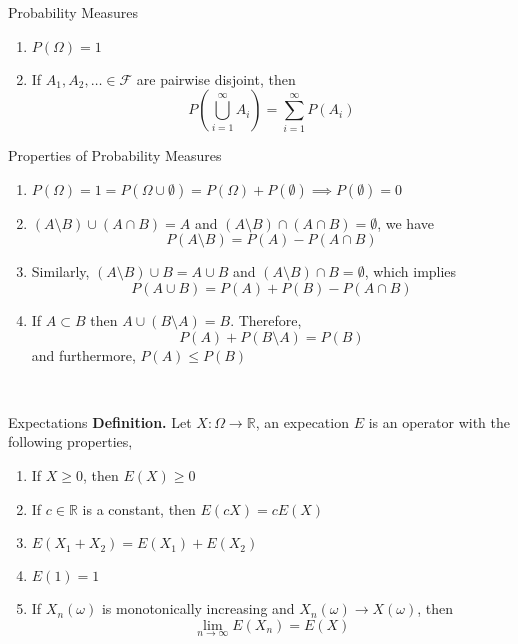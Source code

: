 \documentclass{article}
\begin{document}
\begin{multicols*}{3}
\begin{blackbox}{Probability Measures}
\begin{enumerate}[label=(\roman*)]
        \item $P(\Omega) = 1$
        \item If $A_1, A_2, \ldots \in \mathcal{F}$ are pairwise disjoint, then\\[-2ex]
        \[P\left(\bigcup_{i=1}^\infty A_i\right) = \sum_{i=1}^\infty P(A_i)\]
    \end{enumerate}
    \begin{bluebox}{Properties of Probability Measures}
        \begin{enumerate}[label=(\roman*)]
            \item $P(\Omega) = 1 = P(\Omega \cup \emptyset) = P(\Omega) + P(\emptyset) \implies P(\emptyset) = 0$
            \item $(A\setminus B) \cup (A \cap B) = A$ and $(A\setminus B) \cap (A \cap B) = \emptyset$, we have\\[-2ex]
            \[P(A \setminus B) = P(A) - P(A \cap B)\]
            \item Similarly, $(A \setminus B) \cup B = A \cup B$ and $(A \setminus B) \cap B = \emptyset$, which implies\\[-2ex] 
            \[P(A \cup B) = P(A) + P(B) - P(A \cap B)\]
            \item If $A \subset B$ then $A \cup (B \setminus A) = B$. Therefore, \\[-1ex]
            \[P(A) + P(B \setminus A) = P(B)\]
            and furthermore,
            $P(A) \leq P(B)$
        \end{enumerate}
    \end{bluebox}\\[-2ex]
\end{blackbox}
\begin{blackbox}{Expectations}
    \textbf{Definition.} Let $X: \Omega \rightarrow \mathbb{R}$, an expecation $E$ is an operator with the following properties, 
    \begin{enumerate}[label=(\roman*)]
        \item If $X \geq 0$, then $E(X) \geq 0$
        \item If $c \in \mathbb{R}$ is a constant, then $E(cX) = cE(X)$
        \item $E(X_1 + X_2) = E(X_1) + E(X_2)$
        \item $E(1) = 1$
        \item If $X_n(\omega)$ is monotonically increasing and $X_n(\omega) \rightarrow X(\omega)$, then 
        \[\lim_{n\rightarrow\infty} E(X_n) = E(X)\]
    \end{enumerate}

\end{blackbox}
\end{multicols*}
\end{document}
